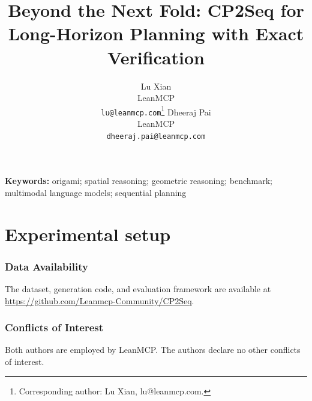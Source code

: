 \documentclass{article} %
\title{Beyond the Next Fold: CP2Seq for Long-Horizon Planning with Exact Verification}
\author{Lu Xian \\
LeanMCP \\
\texttt{lu@leanmcp.com}\thanks{Corresponding author: Lu Xian, lu@leanmcp.com.}
\And
Dheeraj Pai \\
LeanMCP \\
\texttt{dheeraj.pai@leanmcp.com}}
\newif\ifdraftnotes
\begin{document}
\maketitle
{}




\noindent\textbf{Keywords:} origami; spatial reasoning; geometric reasoning; benchmark; multimodal language models; sequential planning




\section{Experimental setup}
\label{sec:experimental-setup}







\ifdraftnotes

\fi



\subsubsection*{Data Availability}

The dataset, generation code, and evaluation framework are available at \url{https://github.com/Leanmcp-Community/CP2Seq}.

\subsubsection*{Conflicts of Interest}

Both authors are employed by LeanMCP. The authors declare no other conflicts of interest.




\appendix






\ifdraftnotes

% 
\fi
\end{document}

